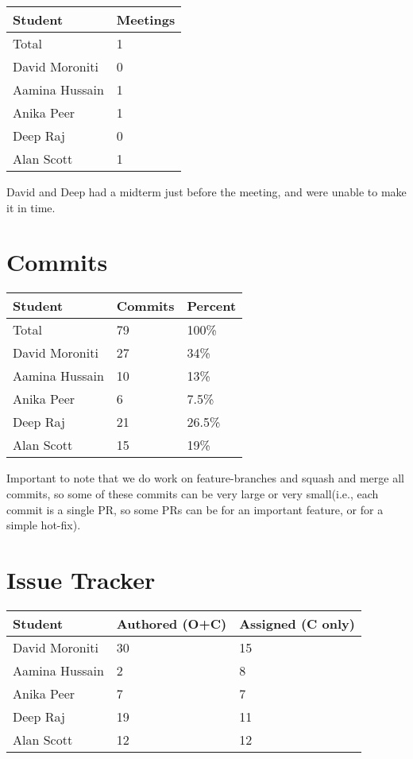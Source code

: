 \documentclass{article}
\begin{document}
\begin{table}[H]
\centering
\begin{tabular}{ll}
\toprule
\textbf{Student} & \textbf{Meetings}\\
\midrule
Total & 1\\
David Moroniti & 0\\
Aamina Hussain & 1\\
Anika Peer & 1\\
Deep Raj & 0\\
Alan Scott & 1\\
\bottomrule
\end{tabular}
\end{table}

David and Deep had a midterm just before the meeting, and were unable to make it in time.

\section{Commits}

\begin{table}[H]
\centering
\begin{tabular}{lll}
\toprule
\textbf{Student} & \textbf{Commits} & \textbf{Percent}\\
\midrule
Total & 79 & 100\% \\
David Moroniti & 27 & 34\% \\
Aamina Hussain & 10 & 13\% \\
Anika Peer & 6 & 7.5\% \\
Deep Raj & 21 & 26.5\% \\
Alan Scott & 15 & 19\% \\
\bottomrule
\end{tabular}
\end{table}

Important to note that we do work on feature-branches and squash and merge all commits, so some of these commits can be very large or very small(i.e.,
each commit is a single PR, so some PRs can be for an important feature, or for a simple hot-fix).

\section{Issue Tracker}

\begin{table}[H]
\centering
\begin{tabular}{lll}
\toprule
\textbf{Student} & \textbf{Authored (O+C)} & \textbf{Assigned (C only)}\\
\midrule
David Moroniti & 30 & 15 \\
Aamina Hussain & 2 & 8 \\
Anika Peer & 7 & 7 \\
Deep Raj & 19 & 11 \\
Alan Scott & 12 & 12 \\
\bottomrule
\end{tabular}
\end{table}
\end{document}
